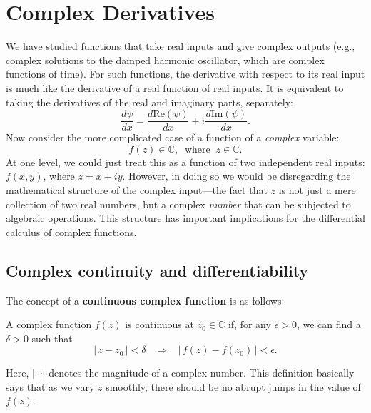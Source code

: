 \documentclass[10pt,a4paper]{article}
\begin{document}
\setcounter{page}{42}
    
\section{Complex Derivatives}
\label{complex-derivatives}

We have studied functions that take real inputs and give complex
outputs (e.g., complex solutions to the damped harmonic oscillator,
which are complex functions of time). For such functions, the
derivative with respect to its real input is much like the derivative
of a real function of real inputs. It is equivalent to taking the
derivatives of the real and imaginary parts, separately:
\begin{equation}
\frac{d\psi}{dx} = \frac{d\mathrm{Re}(\psi)}{dx} + i \frac{d\mathrm{Im}(\psi)}{dx}.
\end{equation}
Now consider the more complicated case of a function of a \emph{complex}
variable:
\begin{equation}
f(z) \in \mathbb{C}, \;\;\mathrm{where}\;\; z \in \mathbb{C}.
\end{equation}
At one level, we could just treat this as a function of two independent
real inputs: $f(x,y)$, where $z = x + i y$. However, in doing so we
would be disregarding the mathematical structure of the complex
input---the fact that $z$ is not just a mere collection of two real
numbers, but a complex \emph{number} that can be subjected to algebraic
operations. This structure has important implications for the
differential calculus of complex functions.

\subsection{Complex continuity and differentiability}
\label{complex-continuity-and-differentiability}

The concept of a \textbf{continuous complex function} is as follows:

\begin{framed} \noindent
A complex function $f(z)$ is continuous at $z_0 \in \mathbb{C}$ if,
for any $\epsilon > 0$, we can find a $\delta > 0$ such that
\[\big|\, z - z_0 \,\big| < \delta \;\;\; \Rightarrow \;\;\; \big|\, f(z) - f(z_0) \,\big| < \epsilon.\]
\end{framed}

\noindent
Here, $\big|\cdots\big|$ denotes the magnitude of a complex
number. This definition basically says that as we vary $z$ smoothly,
there should be no abrupt jumps in the value of $f(z)$.
\end{document}
